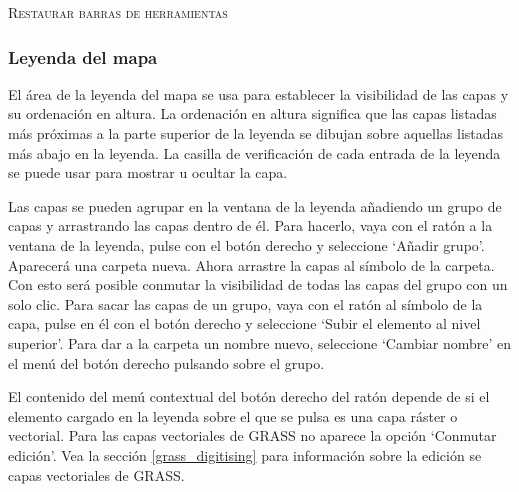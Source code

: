 \begin{Tip}
\caption{\textsc{Restaurar barras de herramientas}} 
\end{Tip}

\subsubsection{Leyenda del mapa}\label{label_legend}

El área de la leyenda del mapa se usa para establecer la visibilidad de las capas y su ordenación en altura.
La ordenación en altura significa que las capas listadas más próximas a la parte superior de la leyenda se dibujan 
sobre aquellas listadas más abajo en la leyenda. La casilla de verificación de cada entrada de la leyenda se 
puede usar para mostrar u ocultar la capa.

Las capas se pueden agrupar en la ventana de la leyenda añadiendo un grupo de capas y arrastrando las capas dentro 
de él. Para hacerlo, vaya con el ratón a la ventana de la leyenda, pulse con el botón derecho y seleccione `Añadir grupo'.
Aparecerá una carpeta nueva. Ahora arrastre la capas al símbolo de la carpeta. Con esto será posible conmutar la 
visibilidad de todas las capas del grupo con un solo clic. Para sacar las capas de un grupo, vaya con el ratón al 
símbolo de la capa, pulse en él con el botón derecho y seleccione `Subir el elemento al nivel superior'. Para 
dar a la carpeta un nombre nuevo, seleccione  `Cambiar nombre' en el menú del botón derecho pulsando sobre el grupo.

El contenido del menú contextual del botón derecho del ratón depende de si el elemento cargado en la leyenda 
sobre el que se pulsa es una capa ráster o vectorial. Para las capas vectoriales de GRASS no aparece la opción 
`Conmutar edición'. Vea la sección \ref{grass_digitising} para información sobre la edición se capas vectoriales de GRASS. 

